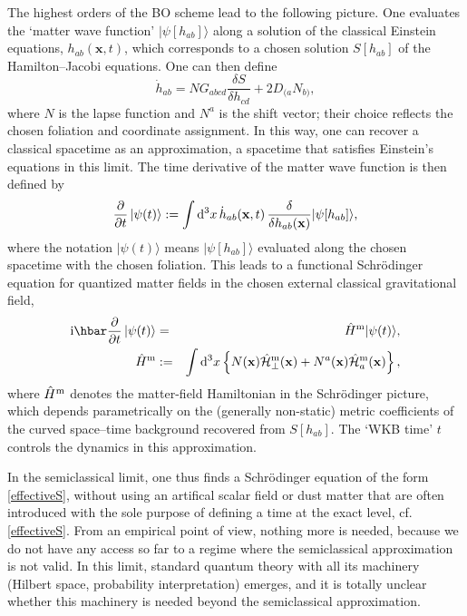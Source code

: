 \documentclass[12pt]{article}
\newcommand{\lb}{\label}
\newcommand{\bdm}{\begin{displaymath}}
\newcommand{\edm}{\end{displaymath}}
\newcommand{\D}{{\rm d}}
\newcommand{\I}{{\rm i}}
\begin{document}
The highest orders of the BO scheme lead to the following picture.
One evaluates the `matter wave function' $|\psi[h_{ab}]\rangle$ along a
solution of the classical Einstein equations, $h_{ab}({\mathbf x},t)$,
which corresponds to a chosen solution $S[h_{ab}]$ of the Hamilton--Jacobi
equations.
One can then define 
\bdm
        \dot{h}_{ab}=NG_{abcd}
        \frac{\delta S}{\delta h_{cd}}+
        2D_{(a}{N_{b)}},
\edm
where $N$ is the lapse function and $N^a$ is the shift vector; their
choice reflects the chosen foliation and coordinate assignment. 
In this way, one can recover a classical spacetime as an
approximation, a spacetime that satisfies Einstein's equations in this
limit.  
The time derivative of the matter wave function is then defined by 
\bdm
        \frac{\partial}{\partial t}\,|\psi(t)\rangle:=
        \int \D^3 x \,\dot{h}_{ab}({\bf x},t)\,
        \frac{\delta}{\delta h_{ab}({\bf x})}
        |\psi[h_{ab}]\rangle, 
\edm
where the notation $|\psi(t)\rangle$ means $|\psi [h_{ab}]\rangle$
evaluated along the chosen spacetime with the chosen foliation.
This leads to a functional Schr\"odinger equation for quantized
matter fields in the chosen external classical gravitational field,
        \begin{eqnarray}
\lb{Schrodinger}
        \I\hbar\frac{\partial}{\partial t}\,
        |\psi(t)\rangle &=& \hat{H}{}^{\rm m}|\psi(t)\rangle,\\
        \hat{H}{}^{\rm m} &:=&
        \int \D^3 x \left\{ N({\bf x})
        \hat{\mathcal H}{}^{\rm m}_{\perp}({\bf x})+
        N^a({\bf x})\hat{\mathcal H}{}^{\rm m}_a({\bf x})\right\},
               \end{eqnarray}
where $\hat{H}{}^{\rm m}$ denotes the 
 matter-field Hamiltonian in the Schr\"odinger
picture, which depends parametrically on the (generally non-static) metric
coefficients of the curved space--time background recovered from
$S[h_{ab}]$. The `WKB time' $t$ controls the dynamics in this approximation.

In the semiclassical limit, one thus finds a Schr\"odinger equation of
the form \eqref{effectiveS}, without using an artifical scalar field
or dust matter that are often introduced with the sole purpose of
defining a time at the exact level, cf. \eqref{effectiveS}. From an
empirical point of view, nothing more is 
needed, because we do not have any access so far to a regime where the
semiclassical approximation is not valid. In this limit, standard
quantum theory with all its machinery (Hilbert space, probability
interpretation) emerges, and it is totally unclear whether this
machinery is needed beyond the semiclassical approximation.
\end{document}
